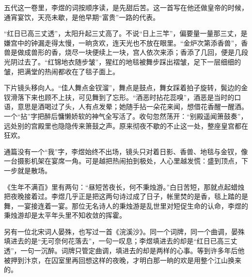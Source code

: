 \begin{appreciation}
五代这一卷里，李煜的词按顺序读，是先甜后苦。这一首写在他还做皇帝的时候，通宵宴饮，天亮未歇，是他早期“富贵”一路的代表。

“红日已高三丈透”，太阳升起三丈高了。不说“日上三竿”，偏要量一量那三丈，是嫌宫中的钟漏走得太慢，一晌贪欢，连天光也不放在眼里。“金炉次第添香兽”，香兽是做成兽形的香，烧尽一块便续上一块，宫人依次来添；香添了几回，便是几段光阴过去了。“红锦地衣随步皱”，猩红的地毯被舞步踩出褶皱，足下一层细细的皱，把满堂的热闹都收在了毯子面上。

下片镜头移向人。“佳人舞点金钗溜”，舞点是鼓点，舞女踩着拍子旋转，鬓边的金钗滑落下来也顾不上扶，可见舞到了忘形。“酒恶时拈花蕊嗅”，酒恶是当时的口语，意思是酒喝过了头，人有点发晕；她随手拈一朵花来闻，想借花香醒一醒酒。一个“拈”字把醉后慵懒娇软的神气全写活了。收句忽然荡开：“别殿遥闻箫鼓奏”，远处别的宫殿里也隐隐传来箫鼓之声。原来彻夜不歇的不止这一处，整座皇宫都在狂欢。

通篇没有一个“我”字，李煜始终不出场，镜头只对着日影、香兽、地毯与金钗，像一台摄影机架在宴席一角。可是越把热闹拍到极处，人心里越发慌：盛到顶点，下一步就是散场。

《生年不满百》里有两句：“昼短苦夜长，何不秉烛游。”白日苦短，那就点起蜡烛把夜晚接着过。李煜几乎正是把这两句诗过成了日子，帐里焚的是香，毯上踏的是舞，一宴接连着一宴。那位无名诗人的秉烛游是乱世里对短促生命的认命，李煜的秉烛游却是太平年头里不知收敛的挥霍。

另有一位北宋词人晏殊，也写过一首《浣溪沙》。同一个词牌，同一个曲调，晏殊填进去的是“无可奈何花落去”，一句一叹息；李煜填进去的却是“红日已高三丈透”，一句一沉醉。词牌只管定曲调，填进去的却是两样的心事。等到许多年后他被押到汴京，在囚室里再回想这样的夜晚，才明白那一晌的欢是用整个江山换来的。
\end{appreciation}
